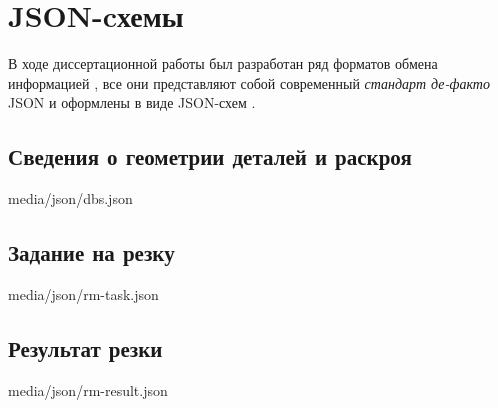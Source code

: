 
\chapter{
  JSON-cхемы
}
\label{app:json}

В ходе диссертационной работы был
разработан ряд форматов обмена информацией
\cite{bi:dbs-schema},
все они представляют собой современный
\textit{стандарт де-факто}
JSON
\cite{bi:JSON}
и оформлены в виде
JSON-схем
\cite{bi:json-schema}.

\section{Сведения о геометрии деталей и раскроя}


{media/json/dbs.json}

\section{Задание на резку}


{media/json/rm-task.json}

\section{Результат резки}


{media/json/rm-result.json}

